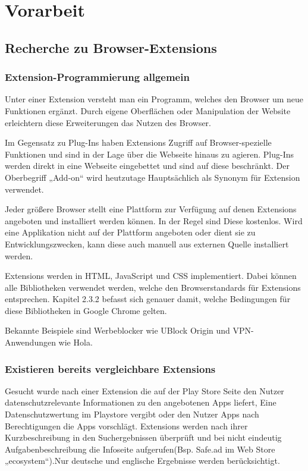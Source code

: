 \chapter{Vorarbeit}
\label{c:vorarbeit}


\section{Recherche zu Browser-Extensions}
\label{s:recherchebrowserextensions}

\subsection{Extension-Programmierung allgemein}
\label{ss:extensionprogallg}

Unter einer Extension versteht man ein Programm, welches den Browser um neue Funktionen ergänzt. Durch eigene Oberflächen oder Manipulation der Website erleichtern diese Erweiterungen das Nutzen des Browser.

Im Gegensatz zu Plug-Ins haben Extensions Zugriff auf Browser-spezielle Funktionen und sind in der Lage über die Webseite hinaus zu agieren. Plug-Ins werden direkt in eine Webseite eingebettet und sind auf diese beschränkt. Der Oberbegriff „Add-on“ wird heutzutage Hauptsächlich als Synonym für Extension verwendet.

Jeder größere Browser stellt eine Plattform zur Verfügung auf denen Extensions angeboten und installiert werden können. In der Regel sind Diese kostenlos. Wird eine Applikation nicht auf der Plattform angeboten oder dient sie zu Entwicklungszwecken, kann diese auch manuell aus externen Quelle installiert werden.

Extensions werden in HTML, JavaScript und CSS implementiert. Dabei können alle Bibliotheken verwendet werden, welche den Browserstandards für Extensions entsprechen. Kapitel 2.3.2 befasst sich genauer damit, welche Bedingungen für diese Bibliotheken in Google Chrome gelten.

Bekannte Beispiele sind Werbeblocker wie UBlock Origin und VPN-Anwendungen wie Hola.

\subsection{Existieren bereits vergleichbare Extensions}
\label{ss:vergleichbareextensions}

Gesucht wurde nach einer Extension die auf der Play Store Seite den Nutzer datenschutzrelevante Informationen zu den angebotenen Apps liefert, Eine Datenschutzwertung im Playstore vergibt oder den Nutzer Apps nach Berechtigungen die Apps vorschlägt.
Extensions werden nach ihrer Kurzbeschreibung in den Suchergebnissen überprüft und bei nicht eindeutig Aufgabenbeschreibung die Infoseite aufgerufen(Bsp. Safe.ad im Web Store „ecosystem“).Nur deutsche und englische  Ergebnisse werden berücksichtigt.

